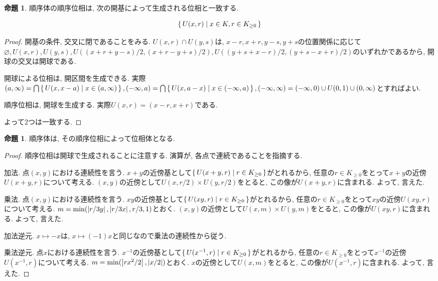 \documentclass[a4paper, twoside]{bxjsarticle}
\newcommand{\abs}[1]{\left\lvert#1\right\rvert}
\theoremstyle{definition}
\newtheorem{prop}[thm]{命題}
\begin{document}
        \begin{prop}
            順序体の順序位相は, 次の開基によって生成される位相と一致する.
            
            \[\set{U(x, r)|x\in K, r\in K_{\geq 0}}\]
        \end{prop}
        \begin{proof}
            開基の条件, 交叉に閉であることをみる. $U(x, r)\cap U(y, s)$は, $x-r, x+r, y-s, y+s$の位置関係に応じて$\varnothing, U(x, r), U(y, s), U((x+r+y-s)/2, (x+r-y+s)/2), U((y+s+x-r)/2, (y+s-x+r)/2)$のいずれかであるから, 開球の交叉は開球である.
            
            開球による位相は, 開区間を生成できる. 実際$(a, \infty)=\bigcap\set{U(x, x-a)|x\in (a, \infty)}, (-\infty, a)=\bigcap\set{U(x, a-x)|x\in (-\infty, a)}, (-\infty, \infty)=(-\infty, 0)\cup U(0, 1)\cup(0, \infty)$とすればよい.
            
            順序位相は, 開球を生成する. 実際$U(x, r)=(x-r, x+r)$である.
            
            よって2つは一致する.
        \end{proof}
        \begin{prop}
            順序体は, その順序位相によって位相体となる.
        \end{prop}
        \begin{proof}
            順序位相は開球で生成されることに注意する. 演算が, 各点で連続であることを指摘する.
            
            加法. 点$(x, y)$における連続性を言う. $x+y$の近傍基として$\set{U(x+y, r)|r\in K_{\geq 0}}$がとれるから, 任意の$r\in K_{\geq 0}$をとって$x+y$の近傍$U(x+y, r)$について考える. $(x, y)$の近傍として$U(x, r/2)\times U(y, r/2)$をとると, この像が$U(x+y, r)$に含まれる. よって, 言えた.
            
            乗法. 点$(x, y)$における連続性を言う. $xy$の近傍基として$\set{U(xy, r)|r\in K_{\geq 0}}$がとれるから, 任意の$r\in K_{\geq 0}$をとって$xy$の近傍$U(xy, r)$について考える. $m={\rm min}(\abs{r/3y}, \abs{r/3x}, r/3, 1)$とおく. $(x, y)$の近傍として$U(x, m)\times U(y, m)$をとると, この像が$U(xy, r)$に含まれる. よって, 言えた.
            
            加法逆元. $x\mapsto -x$は, $x\mapsto (-1)x$と同じなので乗法の連続性から従う.
            
            乗法逆元. 点$x$における連続性を言う. $x^{-1}$の近傍基として$\set{U(x^{-1}, r)|r\in K_{\geq 0}}$がとれるから, 任意の$r\in K_{\geq 0}$をとって$x^{-1}$の近傍$U(x^{-1}, r)$について考える. $m={\rm min}(\abs{rx^2/2}, \abs{x/2})$とおく. $x$の近傍として$U(x, m)$をとると, この像が$U(x^{-1}, r)$に含まれる. よって, 言えた.
        \end{proof}
\end{document}
